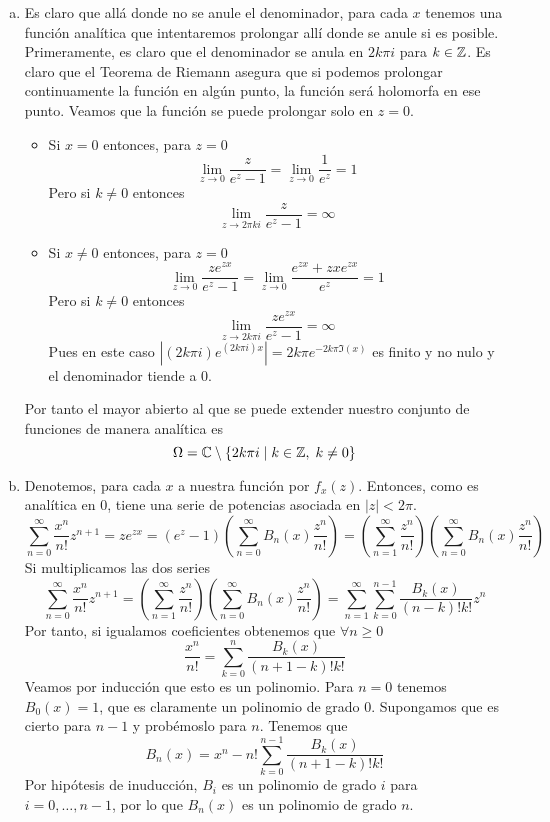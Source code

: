 \documentclass[twoside]{article}
\begin{document}
\begin{solucion}
\begin{enumerate}[(a)]
\item Es claro que allá donde no se anule el denominador, para cada $x$ tenemos una función analítica que intentaremos prolongar allí donde se anule si es posible. Primeramente, es claro que el denominador se anula en $2k\pi i$ para $k\in \mathbb{Z}$. Es claro que el Teorema de Riemann asegura que si podemos prolongar continuamente la función en algún punto, la función será holomorfa en ese punto. Veamos que la función se puede prolongar solo en $z=0$.
\begin{itemize}
\item Si $x=0$ entonces, para $z=0$
$$
\lim_{z\to 0}\frac{z}{e^z-1} = \lim_{z\to 0}\frac{1}{e^z} = 1
$$
Pero si $k\neq 0$ entonces
$$
\lim_{z\to 2\pi k i}\frac{z}{e^z-1} = \infty
$$
\item Si $x\neq 0$ entonces, para $z=0$
$$
\lim_{z\to 0}\frac{ze^{zx}}{e^z-1} = \lim_{z\to 0}\frac{e^{zx}+zxe^{zx}}{e^z} = 1
$$
Pero si $k\neq 0$ entonces
$$
\lim_{z\to 2k\pi i}\frac{ze^{zx}}{e^z-1} = \infty
$$
Pues en este caso $|(2k\pi i)e^{(2k\pi i)x}| = 2k\pi e^{-2k\pi \Im(x)}$ es finito y no nulo y el denominador tiende a $0$.
\end{itemize}
Por tanto el mayor abierto al que se puede extender nuestro conjunto de funciones de manera analítica es
$$
\Omega = \mathbb{C}\setminus\{2k\pi i \mid k\in \mathbb{Z},\; k\neq 0\}
$$
\item Denotemos, para cada $x$ a nuestra función por $f_x(z)$. Entonces, como es analítica en $0$, tiene una serie de potencias asociada en $|z|<2\pi$. 
\[ \sum_{n=0}^\infty \frac{x^n}{n!}z^{n+1}= z e^{zx} =(e^z-1) \left(\sum_{n=0}^\infty B_n(x) \frac{z^n}{n!}\right)=\left( \sum_{n=1}^\infty \frac{z^n}{n!}\right)\left(\sum_{n=0}^\infty B_n(x) \frac{z^n}{n!}\right)\]
Si multiplicamos las dos series
\[ \sum_{n=0}^\infty \frac{x^n}{n!}z^{n+1}= \left( \sum_{n=1}^\infty \frac{z^n}{n!}\right)\left(\sum_{n=0}^\infty B_n(x) \frac{z^n}{n!}\right) = \sum_{n=1}^\infty\sum_{k=0}^{n-1}\frac{B_k(x)}{(n-k)!k!} z^n \]
Por tanto, si igualamos coeficientes obtenemos que $\forall n\geq 0$
$$
\frac{x^{n}}{n!} = \sum_{k=0}^{n} \frac{B_k(x)}{(n+1-k)!k!}
$$
Veamos por inducción que esto es un polinomio. Para $n=0$ tenemos $B_0(x) = 1$, que es claramente un polinomio de grado $0$. Supongamos que es cierto para $n-1$ y probémoslo para $n$. Tenemos que
$$
B_n(x) = x^n - n!\sum_{k=0}^{n-1} \frac{B_k(x)}{(n+1-k)!k!}
$$
Por hipótesis de inuducción, $B_i$ es un polinomio de grado $i$ para $i=0,\dotsc,n-1$, por lo que $B_n(x)$ es un polinomio de grado $n$.

\end{enumerate}
\end{solucion}
\end{document}
